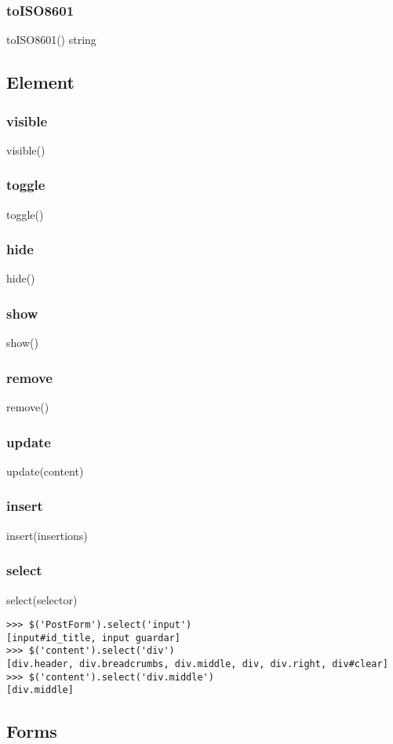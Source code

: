 {{\subsubsection*{toISO8601}
toISO8601() \rightarrow string

\subsection{Element}
\subsubsection*{visible}
visible()
\subsubsection*{toggle}
toggle()
\subsubsection*{hide}
hide()
\subsubsection*{show}
show()
\subsubsection*{remove}
remove()
\subsubsection*{update}
update(content)
\subsubsection*{insert}
insert(insertions)
\subsubsection*{select}
select(selector)

\begin{lstlisting}[style=consola]
>>> $('PostForm').select('input')
[input#id_title, input guardar]
>>> $('content').select('div')
[div.header, div.breadcrumbs, div.middle, div, div.right, div#clear]
>>> $('content').select('div.middle')
[div.middle]
\end{lstlisting}

\subsection{Forms}
}}
